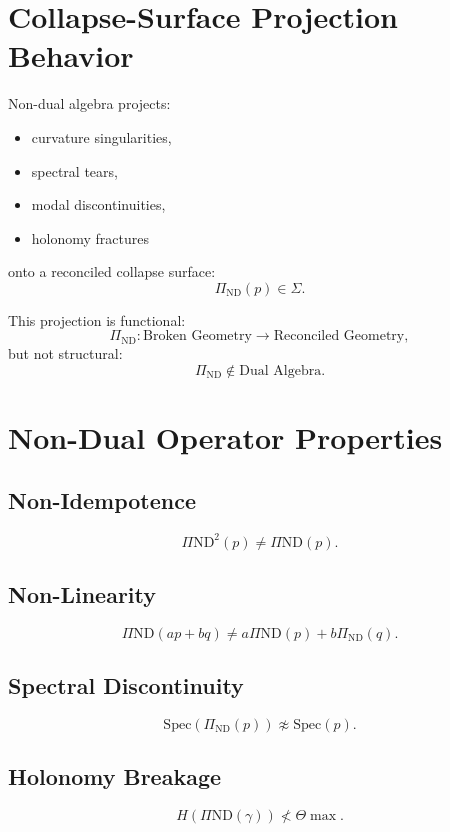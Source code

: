 \documentclass[11pt]{article}
\begin{document}
\section{Collapse-Surface Projection Behavior}

Non-dual algebra projects:
\begin{itemize}
  \item curvature singularities,
  \item spectral tears,
  \item modal discontinuities,
  \item holonomy fractures
\end{itemize}
onto a reconciled collapse surface:
\[
\Pi_{\mathrm{ND}}(p) \in \Sigma.
\]

This projection is functional:
\[
\Pi_{\mathrm{ND}} : \text{Broken Geometry} \to \text{Reconciled Geometry},
\]
but not structural:
\[
\Pi_{\mathrm{ND}} \notin \text{Dual Algebra}.
\]

\section{Non-Dual Operator Properties}

\subsection{Non-Idempotence}
\[
\Pi{\mathrm{ND}}^2(p) \ne \Pi{\mathrm{ND}}(p).
\]

\subsection{Non-Linearity}
\[
\Pi{\mathrm{ND}}(a p + b q) \ne a \Pi{\mathrm{ND}}(p) + b \Pi_{\mathrm{ND}}(q).
\]

\subsection{Spectral Discontinuity}
\[
\mathrm{Spec}(\Pi_{\mathrm{ND}}(p)) \not\approx \mathrm{Spec}(p).
\]

\subsection{Holonomy Breakage}
\[
H(\Pi{\mathrm{ND}}(\gamma)) \not< \Theta{\max}.
\]

\end{document}

